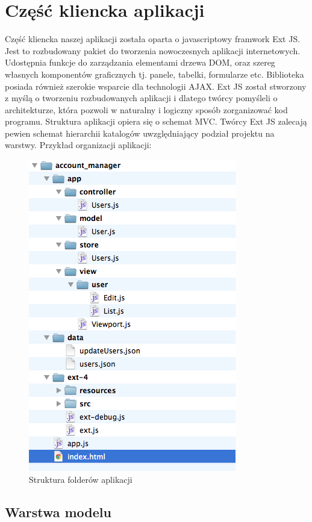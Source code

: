 \chapter{Część kliencka aplikacji}

Część kliencka naszej aplikacji została oparta o javascriptowy framwork Ext JS. Jest to rozbudowany pakiet do tworzenia nowoczesnych aplikacji internetowych. Udostępnia funkcje do zarządzania elementami drzewa DOM, oraz szereg własnych komponentów graficznych tj. panele, tabelki, formularze etc. Biblioteka posiada również szerokie wsparcie dla technologii AJAX. Ext JS został stworzony z myślą o tworzeniu rozbudowanych aplikacji i dlatego twórcy pomyśleli o architekturze, która pozwoli w naturalny i logiczny sposób zorganizować kod programu. Struktura aplikacji opiera się o schemat MVC. Twórcy Ext JS zalecają pewien schemat hierarchii katalogów uwzględniający podział projektu na warstwy. Przykład organizacji aplikacji:

\begin{figure}[H]
	\centering
	\includegraphics[scale=0.5]{images/struktura_folderow.png}
	\caption{Struktura folderów aplikacji}
\end{figure}

\section{Warstwa modelu}

